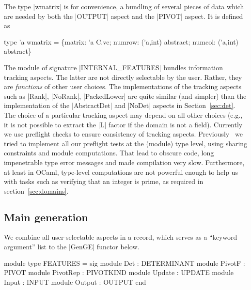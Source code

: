 \documentclass{elsart}
\begin{document}
The type |wmatrix| is for convenience, a bundling of several pieces
of data which are needed by both the |OUTPUT| aspect and the |PIVOT| 
aspect.  It is defined as
\begin{code}
type 'a wmatrix = \{matrix: 'a C.vc; numrow: ('a,int) abstract; 
                   numcol: ('a,int) abstract\}
\end{code}

The module of signature |INTERNAL_FEATURES| bundles information
tracking aspects. The latter are not directly selectable by the
user. Rather, they are \emph{functions} of other user choices. The
implementations of the tracking aspects such as |Rank|, |NoRank|,
|PackedLower| are quite similar (and simpler) than the implementation
of the |AbstractDet| and |NoDet| aspects in Section~\ref{sec:det}. The
choice of a particular tracking aspect may depend on all other choices
(e.g., it is not possible to extract the |L| factor if the domain is
not a field). Currently we use preflight checks to ensure consistency
of tracking aspects. Previously~\cite{CaretteKiselyov05} we tried to
implement all our preflight tests at the (module) type level, using
sharing constraints and module computations. That lead to obscure
code, long impenetrable type error messages and made compilation very
slow.  Furthermore, at least in OCaml, type-level computations are not
powerful enough to help us with tasks such as verifying that an integer
is prime, as required in section~\ref{sec:domains}.

\subsection{Main generation}
We combine all user-selectable aspects in a record, which serves as a ``keyword
argument'' list to the |GenGE| functor below.
\begin{code}
module type FEATURES = sig
  module Det       : DETERMINANT
  module PivotF    : PIVOT
  module PivotRep  : PIVOTKIND
  module Update    : UPDATE
  module Input     : INPUT
  module Output    : OUTPUT
end
\end{code}
\end{document}
